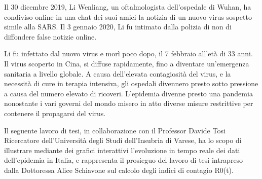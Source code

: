 
Il 30 dicembre 2019, Li Wenliang, un oftalmologista dell’ospedale di Wuhan, ha condiviso online in una chat dei suoi amici la notizia di un nuovo virus sospetto simile alla SARS.
Il 3 gennaio 2020, Li fu intimato dalla polizia di non di diffondere false notizie online.

Li fu infettato dal nuovo virus e morì poco dopo, il 7 febbraio all’età di 33 anni.
Il virus scoperto in Cina, si diffuse rapidamente, fino a diventare un'emergenza sanitaria a livello globale.
A causa dell’elevata contagiosità del virus, e la necessità di cure in terapia intensiva, gli ospedali divennero presto sotto pressione a causa del numero elevato di ricoveri.
L'epidemia divenne presto una pandemia nonostante i vari governi del mondo misero in atto diverse misure restrittive per contenere il propagarsi del virus.

Il seguente lavoro di tesi, in collaborazione con il Professor Davide Tosi Ricercatore dell’Università degli Studi dell’Insubria di Varese, ha lo scopo di illustrare mediante dei grafici interattivi l’evoluzione in tempo reale dei dati dell’epidemia in Italia, e rappresenta il prosieguo del lavoro di tesi intrapreso dalla Dottoressa Alice Schiavone sul calcolo degli indici di contagio R0(t)\cite{schiavone_tesi}.